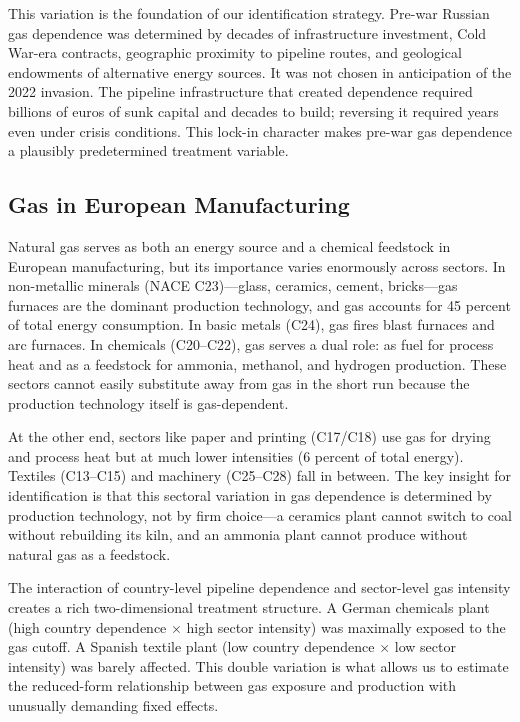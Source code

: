 \documentclass[12pt]{article}
\begin{document}
This variation is the foundation of our identification strategy. Pre-war Russian gas dependence was determined by decades of infrastructure investment, Cold War-era contracts, geographic proximity to pipeline routes, and geological endowments of alternative energy sources. It was not chosen in anticipation of the 2022 invasion. The pipeline infrastructure that created dependence required billions of euros of sunk capital and decades to build; reversing it required years even under crisis conditions. This lock-in character makes pre-war gas dependence a plausibly predetermined treatment variable.

\subsection{Gas in European Manufacturing}

Natural gas serves as both an energy source and a chemical feedstock in European manufacturing, but its importance varies enormously across sectors. In non-metallic minerals (NACE C23)---glass, ceramics, cement, bricks---gas furnaces are the dominant production technology, and gas accounts for 45 percent of total energy consumption. In basic metals (C24), gas fires blast furnaces and arc furnaces. In chemicals (C20--C22), gas serves a dual role: as fuel for process heat and as a feedstock for ammonia, methanol, and hydrogen production. These sectors cannot easily substitute away from gas in the short run because the production technology itself is gas-dependent.

At the other end, sectors like paper and printing (C17/C18) use gas for drying and process heat but at much lower intensities (6 percent of total energy). Textiles (C13--C15) and machinery (C25--C28) fall in between. The key insight for identification is that this sectoral variation in gas dependence is determined by production technology, not by firm choice---a ceramics plant cannot switch to coal without rebuilding its kiln, and an ammonia plant cannot produce without natural gas as a feedstock.

The interaction of country-level pipeline dependence and sector-level gas intensity creates a rich two-dimensional treatment structure. A German chemicals plant (high country dependence $\times$ high sector intensity) was maximally exposed to the gas cutoff. A Spanish textile plant (low country dependence $\times$ low sector intensity) was barely affected. This double variation is what allows us to estimate the reduced-form relationship between gas exposure and production with unusually demanding fixed effects.
\end{document}
